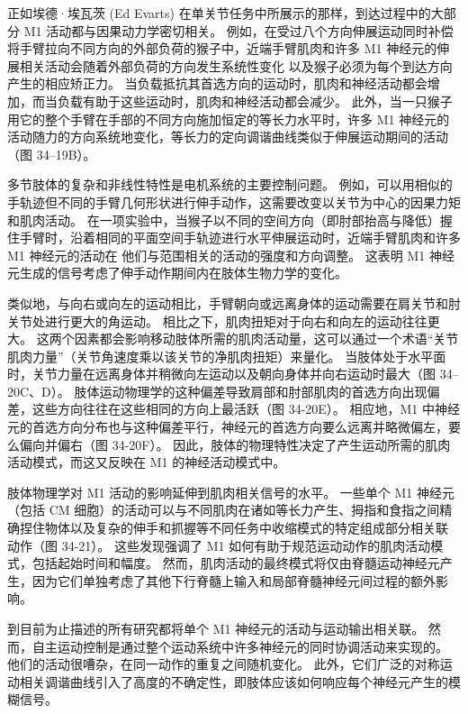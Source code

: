 正如埃德·埃瓦茨 (Ed Evarts) 在单关节任务中所展示的那样，到达过程中的大部分 M1 活动都与因果动力学密切相关。 例如，在受过八个方向伸展运动同时补偿将手臂拉向不同方向的外部负荷的猴子中，近端手臂肌肉和许多 M1 神经元的伸展相关活动会随着外部负荷的方向发生系统性变化 以及猴子必须为每个到达方向产生的相应矫正力。 当负载抵抗其首选方向的运动时，肌肉和神经活动都会增加，而当负载有助于这些运动时，肌肉和神经活动都会减少。 此外，当一只猴子用它的整个手臂在手部的不同方向施加恒定的等长力水平时，许多 M1 神经元的活动随力的方向系统地变化，等长力的定向调谐曲线类似于伸展运动期间的活动 （图 34–19B）。

多节肢体的复杂和非线性特性是电机系统的主要控制问题。 例如，可以用相似的手轨迹但不同的手臂几何形状进行伸手动作，这需要改变以关节为中心的因果力矩和肌肉活动。 在一项实验中，当猴子以不同的空间方向（即肘部抬高与降低）握住手臂时，沿着相同的平面空间手轨迹进行水平伸展运动时，近端手臂肌肉和许多 M1 神经元的活动在 他们与范围相关的活动的强度和方向调整。 这表明 M1 神经元生成的信号考虑了伸手动作期间内在肢体生物力学的变化。

类似地，与向右或向左的运动相比，手臂朝向或远离身体的运动需要在肩关节和肘关节处进行更大的角运动。 相比之下，肌肉扭矩对于向右和向左的运动往往更大。 这两个因素都会影响移动肢体所需的肌肉活动量，这可以通过一个术语“关节肌肉力量”（关节角速度乘以该关节的净肌肉扭矩）来量化。 当肢体处于水平面时，关节力量在远离身体并稍微向左运动以及朝向身体并向右运动时最大（图 34–20C、D）。 肢体运动物理学的这种偏差导致肩部和肘部肌肉的首选方向出现偏差，这些方向往往在这些相同的方向上最活跃（图 34-20E）。 相应地，M1 中神经元的首选方向分布也与这种偏差平行，神经元的首选方向要么远离并略微偏左，要么偏向并偏右（图 34-20F）。 因此，肢体的物理特性决定了产生运动所需的肌肉活动模式，而这又反映在 M1 的神经活动模式中。

肢体物理学对 M1 活动的影响延伸到肌肉相关信号的水平。 一些单个 M1 神经元（包括 CM 细胞）的活动可以与不同肌肉在诸如等长力产生、拇指和食指之间精确捏住物体以及复杂的伸手和抓握等不同任务中收缩模式的特定组成部分相关联 动作（图 34-21）。 这些发现强调了 M1 如何有助于规范运动动作的肌肉活动模式，包括起始时间和幅度。 然而，肌肉活动的最终模式将仅由脊髓运动神经元产生，因为它们单独考虑了其他下行脊髓上输入和局部脊髓神经元间过程的额外影响。

到目前为止描述的所有研究都将单个 M1 神经元的活动与运动输出相关联。 然而，自主运动控制是通过整个运动系统中许多神经元的同时协调活动来实现的。 他们的活动很嘈杂，在同一动作的重复之间随机变化。 此外，它们广泛的对称运动相关调谐曲线引入了高度的不确定性，即肢体应该如何响应每个神经元产生的模糊信号。

